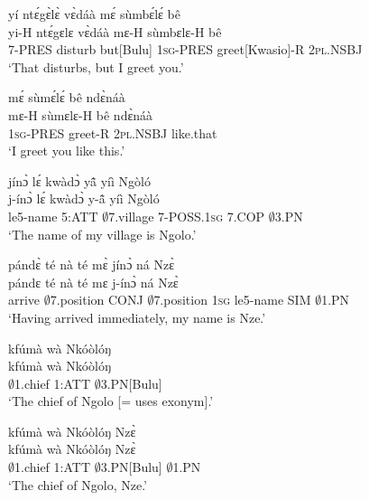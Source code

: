 \begin{exe} 
\exC\label{03}
  \glll      yí ntɛ́gɛ̀lɛ̀ vɛ̀dáà mɛ́ sùmbɛ́lɛ́ bê \\
           yi-H ntɛ́gɛlɛ vɛ̀dáà mɛ-H sùmbɛlɛ-H bê \\
              7-PRES disturb but[Bulu] 1\textsc{sg}-PRES greet[Kwasio]-R 2\textsc{pl}.NSBJ \\
    \trans `That disturbs, but I greet you.'
\end{exe}

\begin{exe} 
\exC\label{04}
  \glll     mɛ́ sùmɛ́lɛ́ bê ndɛ̀náà \\
            mɛ-H sùmɛlɛ-H bê ndɛ̀náà \\
              1\textsc{sg}-PRES greet-R 2\textsc{pl}.NSBJ like.that   \\
    \trans `I greet you like this.'
\end{exe}

\begin{exe} 
\exC\label{05}
  \glll  jínɔ̀ lɛ́ kwàdɔ̀ yã̂ yíì Ngòló \\
         j-ínɔ̀ lɛ́ kwàdɔ̀ y-ã̂ yíì Ngòló \\
              le5-name 5:ATT $\emptyset$7.village 7-POSS.1\textsc{sg} 7.COP $\emptyset$3.PN  \\
    \trans `The name of my village is Ngolo.'
\end{exe}

\begin{exe} 
\exC\label{06}
  \glll  pándɛ̀ té nà té mɛ̀ jínɔ̀ ná Nzɛ̀ \\
          pándɛ té nà té mɛ j-ínɔ̀ ná Nzɛ̀ \\
              arrive  $\emptyset$7.position CONJ $\emptyset$7.position 1\textsc{sg} le5-name SIM $\emptyset$1.PN   \\
    \trans `Having arrived immediately, my name is Nze.'
\end{exe}

\begin{exe} 
\exC\label{07}
  \glll     kfúmà wà Nkóòlóŋ \\
          kfúmà wà Nkóòlóŋ \\
              $\emptyset$1.chief 1:ATT $\emptyset$3.PN[Bulu] \\
    \trans `The chief of Ngolo [= uses exonym].'
\end{exe}

\begin{exe} 
\exC\label{08}
  \glll     kfúmà wà Nkóòlóŋ Nzɛ̀ \\
           kfúmà wà Nkóòlóŋ Nzɛ̀ \\
              $\emptyset$1.chief 1:ATT $\emptyset$3.PN[Bulu] $\emptyset$1.PN\\
    \trans `The chief of Ngolo, Nze.'
\end{exe}

